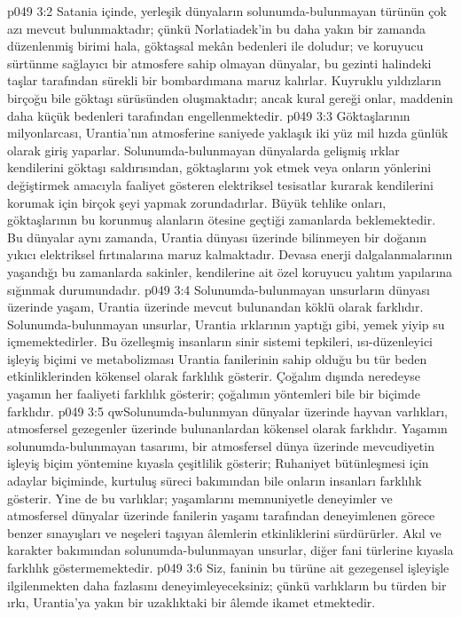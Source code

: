 \vs p049 3:2 Satania içinde, yerleşik dünyaların solunumda\hyp{}bulunmayan türünün çok azı mevcut bulunmaktadır; çünkü Norlatiadek’in bu daha yakın bir zamanda düzenlenmiş birimi hala, göktaşsal mekân bedenleri ile doludur; ve koruyucu sürtünme sağlayıcı bir atmosfere sahip olmayan dünyalar, bu gezinti halindeki taşlar tarafından sürekli bir bombardımana maruz kalırlar. Kuyruklu yıldızların birçoğu bile göktaşı sürüsünden oluşmaktadır; ancak kural gereği onlar, maddenin daha küçük bedenleri tarafından engellenmektedir.
\vs p049 3:3 Göktaşlarının milyonlarcası, Urantia’nın atmosferine saniyede yaklaşık iki yüz mil hızda günlük olarak giriş yaparlar. Solunumda\hyp{}bulunmayan dünyalarda gelişmiş ırklar kendilerini göktaşı saldırısından, göktaşlarını yok etmek veya onların yönlerini değiştirmek amacıyla faaliyet gösteren elektriksel tesisatlar kurarak kendilerini korumak için birçok şeyi yapmak zorundadırlar. Büyük tehlike onları, göktaşlarının bu korunmuş alanların ötesine geçtiği zamanlarda beklemektedir. Bu dünyalar aynı zamanda, Urantia dünyası üzerinde bilinmeyen bir doğanın yıkıcı elektriksel fırtınalarına maruz kalmaktadır. Devasa enerji dalgalanmalarının yaşandığı bu zamanlarda sakinler, kendilerine ait özel koruyucu yalıtım yapılarına sığınmak durumundadır.
\vs p049 3:4 Solunumda\hyp{}bulunmayan unsurların dünyası üzerinde yaşam, Urantia üzerinde mevcut bulunandan köklü olarak farklıdır. Solunumda\hyp{}bulunmayan unsurlar, Urantia ırklarının yaptığı gibi, yemek yiyip su içmemektedirler. Bu özelleşmiş insanların sinir sistemi tepkileri, ısı\hyp{}düzenleyici işleyiş biçimi ve metabolizması Urantia fanilerinin sahip olduğu bu tür beden etkinliklerinden kökensel olarak farklılık gösterir. Çoğalım dışında neredeyse yaşamın her faaliyeti farklılık gösterir; çoğalımın yöntemleri bile bir biçimde farklıdır.
\vs p049 3:5 qwSolunumda\hyp{}bulunmyan dünyalar üzerinde hayvan varlıkları, atmosfersel gezegenler üzerinde bulunanlardan kökensel olarak farklıdır. Yaşamın solunumda\hyp{}bulunmayan tasarımı, bir atmosfersel dünya üzerinde mevcudiyetin işleyiş biçim yöntemine kıyasla çeşitlilik gösterir; Ruhaniyet bütünleşmesi için adaylar biçiminde, kurtuluş süreci bakımından bile onların insanları farklılık gösterir. Yine de bu varlıklar; yaşamlarını memnuniyetle deneyimler ve atmosfersel dünyalar üzerinde fanilerin yaşamı tarafından deneyimlenen görece benzer sınayışları ve neşeleri taşıyan âlemlerin etkinliklerini sürdürürler. Akıl ve karakter bakımından solunumda\hyp{}bulunmayan unsurlar, diğer fani türlerine kıyasla farklılık göstermemektedir.
\vs p049 3:6 Siz, faninin bu türüne ait gezegensel işleyişle ilgilenmekten daha fazlasını deneyimleyeceksiniz; çünkü varlıkların bu türden bir ırkı, Urantia’ya yakın bir uzaklıktaki bir âlemde ikamet etmektedir.

